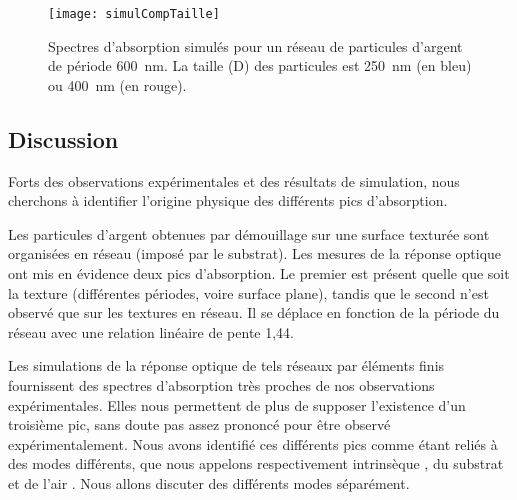 \begin{figure}[!htb]
\centering
\texttt{[image: simulCompTaille]}
\caption{Spectres d'absorption simulés pour un réseau de particules d'argent de période 600~nm. La taille (D) des particules est 250~nm (en bleu) ou 400~nm (en rouge).}
\label{simulCompTaille}
\end{figure}

\subsection{Discussion}
Forts des observations expérimentales et des résultats de simulation, nous cherchons à identifier l'origine physique des différents pics d'absorption.\par 
Les particules d'argent obtenues par démouillage sur une surface texturée sont organisées en réseau (imposé par le substrat). Les mesures de la réponse optique ont mis en évidence deux pics d'absorption. Le premier est présent quelle que soit la texture (différentes périodes, voire surface plane), tandis que le second n'est observé que sur les textures en réseau. Il se déplace en fonction de la période du réseau avec une relation linéaire de pente 1,44.\par 
Les simulations de la réponse optique de tels réseaux par éléments finis fournissent des spectres d'absorption très proches de nos observations expérimentales. Elles nous permettent de plus de supposer l'existence d'un troisième pic, sans doute pas assez prononcé pour être observé expérimentalement. Nous avons identifié ces différents pics comme étant reliés à des modes différents, que nous appelons respectivement \og intrinsèque \fg, \og du substrat \fg{} et \og de l'air \fg. Nous allons discuter des différents modes séparément.\par 
